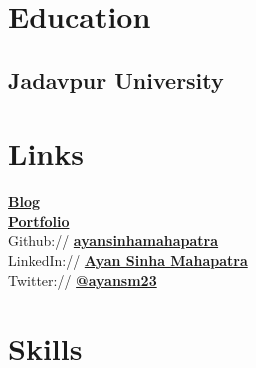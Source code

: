 \documentclass[]{deedy-resume-openfont}
\begin{document}
%
%
\lastupdated

%
%

%
%

\begin{minipage}[t]{0.33\textwidth} 


\section{Education} 

\subsection{Jadavpur University}
\sectionsep


\section{Links} 
\href{https://ayansinha.dev/blog/}{\bf Blog} \\
\href{https://ayansinha.dev/ayan/}{\bf Portfolio} \\
Github:// \href{https://github.com/ayansinhamahapatra}{\bf ayansinhamahapatra} \\
LinkedIn://  \href{https://www.linkedin.com/in/ayansinhaju/}{\bf Ayan Sinha Mahapatra} \\
Twitter://  \href{https://twitter.com/ayansm23}{\bf @ayansm23} \\


\section{Skills}

\end{minipage}
\end{document}
